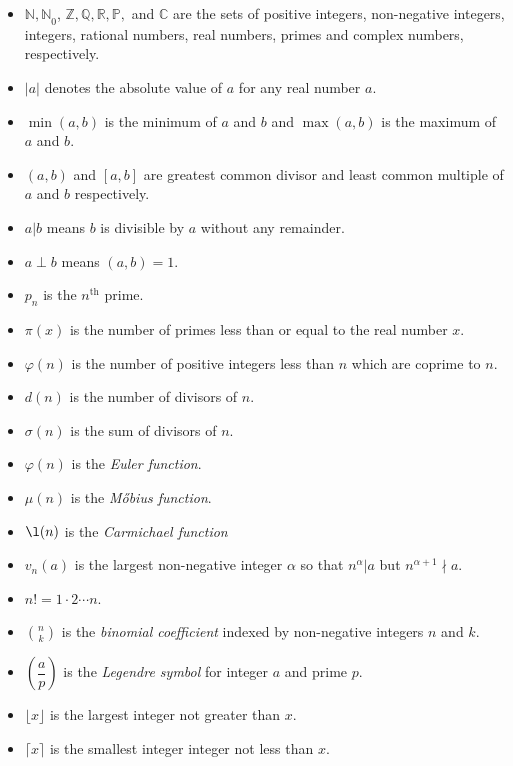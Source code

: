 \documentclass{subfile}
\begin{document}
		\begin{itemize}
			\item $\mathbb{N,N}_0$, $\mathbb{Z, Q, R, P},$ and $\mathbb{C}$ are the sets of positive integers, non-negative integers, integers, rational numbers, real numbers, primes and complex numbers, respectively.
			\item $|a|$ denotes the absolute value of $a$ for any real number $a$.
			\item $\min(a,b)$ is the minimum of $a$ and $b$ and $\max(a,b)$ is the maximum of $a$ and $b$.
			\item $(a,b)$ and $[a,b]$ are greatest common divisor and least common multiple of $a$ and $b$ respectively.
			\item $a|b$ means $b$ is divisible by $a$ without any remainder.
			\item $a\perp b$ means $(a,b)=1$.
			\item $p_n$ is the $n^{\text{th}}$ prime.
			\item $\pi(x)$ is the number of primes less than or equal to the real number $x$.		
			\item $\varphi(n)$ is the number of positive integers less than $n$ which are coprime to $n$.
			\item $d(n)$ is the number of divisors of $n$.
			\item $\sigma(n)$ is the sum of divisors of $n$.
			\item $\varphi(n)$ is the {\it Euler function}.
			\item $\mu(n)$ is the {\it M\H{o}bius function}.
			\item $\l(n)$ is the {\it Carmichael function}
			\item $v_n(a)$ is the largest non-negative integer $\alpha$ so that $n^\alpha|a$ but $n^{\alpha+1}\nmid a$.
			\item $n!=1\cdot2\cdots n$.
			\item $\displaystyle \binom{n}{k}$ is the \textit{binomial coefficient} indexed by non-negative integers $n$ and $k$.
			\item $\left(\dfrac{a}{p}\right)$ is the \textit{Legendre symbol} for integer $a$ and prime $p$.
			\item $\lfloor x \rfloor$ is the  largest integer not greater than $x$.
			\item $\lceil x \rceil$ is the smallest integer integer not less than $x$.
		\end{itemize}
	
		\newpage
\end{document}
